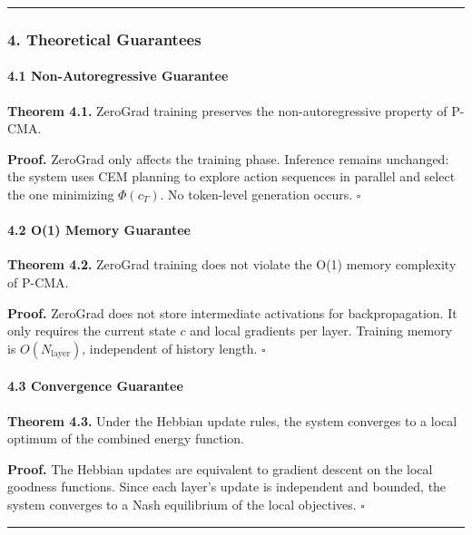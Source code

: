 \documentclass[
  11pt,
  a4paper,
]{article}
\begin{document}
\begin{center}\rule{0.5\linewidth}{0.5pt}\end{center}

\subsubsection{4. Theoretical
Guarantees}\label{theoretical-guarantees-4}

\paragraph{4.1 Non-Autoregressive
Guarantee}\label{non-autoregressive-guarantee}

\textbf{Theorem 4.1.} ZeroGrad training preserves the non-autoregressive
property of P-CMA.

\textbf{Proof.} ZeroGrad only affects the training phase. Inference
remains unchanged: the system uses CEM planning to explore action
sequences in parallel and select the one minimizing \(\Phi(c_T)\). No
token-level generation occurs. \(\square\)

\paragraph{4.2 O(1) Memory Guarantee}\label{o1-memory-guarantee-1}

\textbf{Theorem 4.2.} ZeroGrad training does not violate the O(1) memory
complexity of P-CMA.

\textbf{Proof.} ZeroGrad does not store intermediate activations for
backpropagation. It only requires the current state \(c\) and local
gradients per layer. Training memory is \(O(N_{\text{layer}})\),
independent of history length. \(\square\)

\paragraph{4.3 Convergence Guarantee}\label{convergence-guarantee}

\textbf{Theorem 4.3.} Under the Hebbian update rules, the system
converges to a local optimum of the combined energy function.

\textbf{Proof.} The Hebbian updates are equivalent to gradient descent
on the local goodness functions. Since each layer's update is
independent and bounded, the system converges to a Nash equilibrium of
the local objectives. \(\square\)

\begin{center}\rule{0.5\linewidth}{0.5pt}\end{center}
\end{document}
